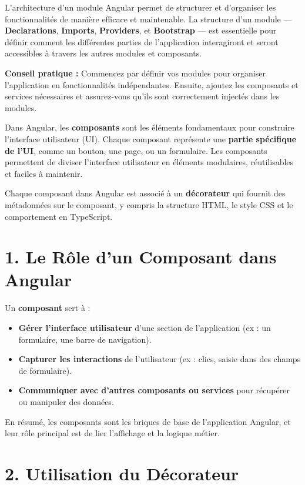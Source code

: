 \documentclass{article}
\begin{document}
L’architecture d’un module Angular permet de structurer et d’organiser les fonctionnalités de manière efficace et maintenable. La structure d’un module — \textbf{Declarations}, \textbf{Imports}, \textbf{Providers}, et \textbf{Bootstrap} — est essentielle pour définir comment les différentes parties de l’application interagiront et seront accessibles à travers les autres modules et composants.

\textbf{Conseil pratique :} Commencez par définir vos modules pour organiser l'application en fonctionnalités indépendantes. Ensuite, ajoutez les composants et services nécessaires et assurez-vous qu’ils sont correctement injectés dans les modules.


Dans Angular, les \textbf{composants} sont les éléments fondamentaux pour construire l'interface utilisateur (UI). Chaque composant représente une \textbf{partie spécifique de l'UI}, comme un bouton, une page, ou un formulaire. Les composants permettent de diviser l'interface utilisateur en éléments modulaires, réutilisables et faciles à maintenir.

Chaque composant dans Angular est associé à un \textbf{décorateur \@Component} qui fournit des métadonnées sur le composant, y compris la structure HTML, le style CSS et le comportement en TypeScript.

\section*{1. Le Rôle d’un Composant dans Angular}

Un \textbf{composant} sert à :
\begin{itemize}
  \item \textbf{Gérer l’interface utilisateur} d’une section de l’application (ex : un formulaire, une barre de navigation).
  \item \textbf{Capturer les interactions} de l'utilisateur (ex : clics, saisie dans des champs de formulaire).
  \item \textbf{Communiquer avec d’autres composants ou services} pour récupérer ou manipuler des données.
\end{itemize}

En résumé, les composants sont les briques de base de l’application Angular, et leur rôle principal est de lier l'affichage et la logique métier.

\section*{2. Utilisation du Décorateur \@Component}
\end{document}
